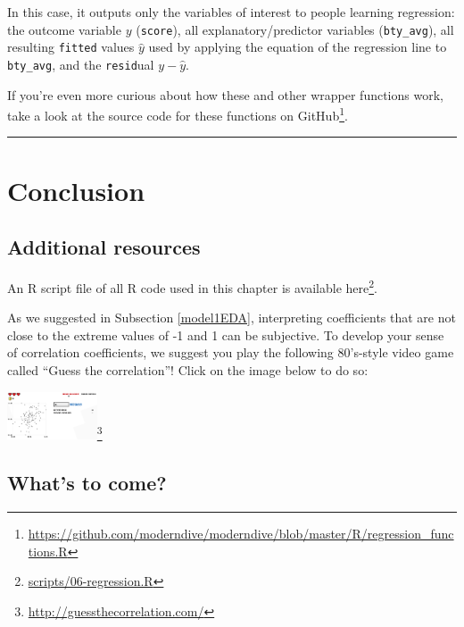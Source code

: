 \documentclass[12pt, krantz2,]{krantz}
\renewcommand{\href}[2]{#2\footnote{\url{#1}}}
\begin{document}
In this case, it outputs only the variables of interest to people learning regression: the outcome variable \(y\) (\texttt{score}), all explanatory/predictor variables (\texttt{bty\_avg}), all resulting \texttt{fitted} values \(\hat{y}\) used by applying the equation of the regression line to \texttt{bty\_avg}, and the \texttt{resid}ual \(y - \hat{y}\).

If you're even more curious about how these and other wrapper functions work, take a look at the source code for these functions on \href{https://github.com/moderndive/moderndive/blob/master/R/regression_functions.R}{GitHub}.

\begin{center}\rule{0.5\linewidth}{\linethickness}\end{center}

\hypertarget{conclusion-4}{%
\section{Conclusion}\label{conclusion-4}}

\hypertarget{additional-resources-basic-regression}{%
\subsection{Additional resources}\label{additional-resources-basic-regression}}

An R script file of all R code used in this chapter is available \href{scripts/06-regression.R}{here}.

As we suggested in Subsection \ref{model1EDA}, interpreting coefficients that are not close to the extreme values of -1 and 1 can be subjective. To develop your sense of correlation coefficients, we suggest you play the following 80's-style video game called ``Guess the correlation''! Click on the image below to do so:

\begin{center}
\href{http://guessthecorrelation.com/}{\includegraphics[width=0.2\textwidth]{images/guess_the_correlation.png}}
\end{center}

\hypertarget{whats-to-come-4}{%
\subsection{What's to come?}\label{whats-to-come-4}}
\end{document}
